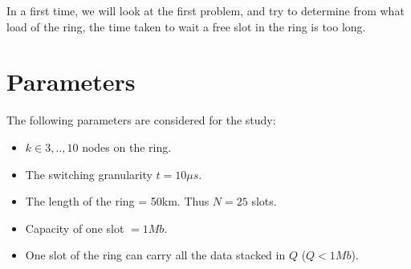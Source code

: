 \documentclass[a4paper,10pt]{article}
\begin{document}
In a first time, we will look at the first problem, and try to determine from what load of the ring, the time taken to wait a free slot in the ring is too long.

\section*{Parameters}
The following parameters are considered for the study:
\begin{itemize}
 \item $k \in {3,..,10}$ nodes on the ring.
 \item The switching granularity $t = 10\mu s$. 
 \item The length of the ring = 50km. Thus $N = 25$ slots.
 \item Capacity of one slot $= 1Mb$.
 \item One slot of the ring can carry all the data stacked in $Q$ ($Q < 1Mb$).

\end{itemize}
\end{document}
